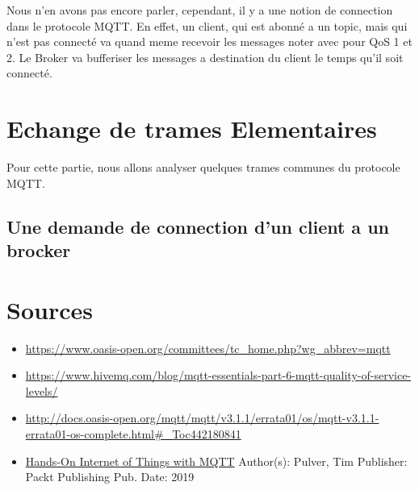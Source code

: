 \documentclass[a4paper,10pt]{article}
\begin{document}
Nous n'en avons pas encore parler, cependant, il y a une notion de connection dans le protocole MQTT. En effet, un client, qui est abonné a un topic, mais qui n'est pas connecté va quand meme recevoir les messages noter avec pour QoS 1 et 2. Le Broker va bufferiser les messages a destination du client le temps qu'il soit connecté.


\section{Echange de trames Elementaires}

Pour cette partie, nous allons analyser quelques trames  communes du protocole MQTT.
\subsection{Une demande de connection d'un client a un brocker}



 \section{Sources}

\begin{itemize}
 \item \url{https://www.oasis-open.org/committees/tc_home.php?wg_abbrev=mqtt}
 \item \url{https://www.hivemq.com/blog/mqtt-essentials-part-6-mqtt-quality-of-service-levels/}
 \item \url{http://docs.oasis-open.org/mqtt/mqtt/v3.1.1/errata01/os/mqtt-v3.1.1-errata01-os-complete.html#_Toc442180841}
 \item \underline{Hands-On Internet of Things with MQTT} Author(s): Pulver, Tim Publisher: Packt Publishing Pub. Date: 2019
\end{itemize}
\end{document}
